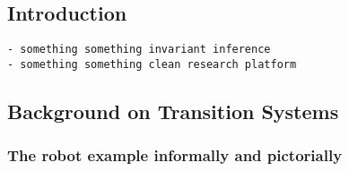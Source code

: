 \chapter{\mypyvy}
\label{chap:mypyvy}


\section{Introduction}

\begin{verbatim}
- something something invariant inference
- something something clean research platform
\end{verbatim}

\lipsum[1]

\section{Background on Transition Systems}

\subsection{The robot example informally and pictorially}

\def\xMin{-8}
\def\xMax{8}
\def\yMin{-5}
\def\yMax{11}

